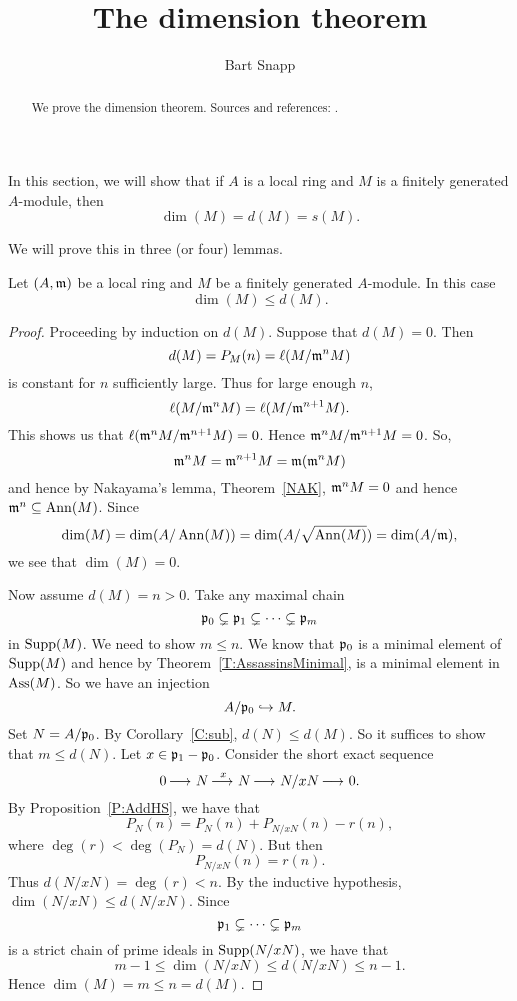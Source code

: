 \documentclass{ximera}
\author{Bart Snapp}
\title{The dimension theorem}
\begin{document}
\begin{abstract}
  We prove the dimension theorem. Sources and
  references: \cite{sD2008,hM1986}.
\end{abstract}
\maketitle


In this section, we will show that if $A$ is a local ring and $M$ is a
finitely generated $A$-module, then
\[
\dim(M) = d(M) = s(M). 
\]

We will prove this in three (or four) lemmas.

\begin{lemma}\label{L:dimd}
  Let $(A,\mathfrak{m})$ be a local ring and $M$ be a finitely generated
  $A$-module. In this case
  \[
  \dim(M)\le d(M).
  \]
  \begin{proof}
    Proceeding by induction on $d(M)$. Suppose that $d(M) = 0$. Then 
    \[
    d(M) = P_M(n) = \ell(M/\mathfrak{m}^n M)
    \]
    is constant for $n$ sufficiently large. Thus for large enough $n$,
    \[
    \ell(M/\mathfrak{m}^n M) = \ell(M/\mathfrak{m}^{n+1}M).
    \]
    This shows us that $\ell(\mathfrak{m}^n M/\mathfrak{m}^{n+1}M) = 0$. Hence $\mathfrak{m}^n
    M/\mathfrak{m}^{n+1}M = 0$. So,
    \[
    \mathfrak{m}^n M = \mathfrak{m}^{n+1}M = \mathfrak{m}(\mathfrak{m}^n M)
    \]
    and hence by Nakayama's lemma, Theorem~\ref{NAK},
     $\mathfrak{m}^n M =0$ and hence $\mathfrak{m}^n\subseteq\operatorname{Ann}(M)$. Since
    \[
    \dim(M) = \dim(A/\operatorname{Ann}(M))  = \dim(A/\sqrt{\operatorname{Ann}(M)}) = \dim(A/\mathfrak{m}),
    \]   
    we see that $\dim(M) = 0$. 
    
    Now assume $d(M) = n> 0$. Take any maximal chain 
    \[
    \mathfrak{p}_0\subsetneq \mathfrak{p}_1 \subsetneq \cdots \subsetneq \mathfrak{p}_m
    \]
    in $\operatorname{Supp}(M)$.  We need to show $m\le n$. We know that $\mathfrak{p}_0$ is a
    minimal element of $\operatorname{Supp}(M)$ and hence by
    Theorem~\ref{T:AssassinsMinimal}, is a minimal element in
    $\operatorname{Ass}(M)$.  So we have an injection
    \[
    A/\mathfrak{p}_0\hookrightarrow M.
    \]
    Set $N = A/\mathfrak{p}_0$.  By Corollary~\ref{C:sub}, $d(N) \le d(M)$.  So
    it suffices to show that $m \le d(N)$.  Let $x \in \mathfrak{p}_1 - \mathfrak{p}_0$.
    Consider the short exact sequence
    \[
    0\mathop{\longrightarrow\,}\limits N \mathop{\longrightarrow\,}\limits^{x} N \mathop{\longrightarrow\,}\limits N/xN \mathop{\longrightarrow\,}\limits 0.
    \]
    By Proposition~\ref{P:AddHS}, we have that
    \[
    P_N(n) = P_N(n) + P_{N/xN}(n) - r(n),
    \]
    where $\deg(r) < \deg(P_N) = d(N)$.  But then
    \[
    P_{N/xN}(n) = r(n).
    \]
    Thus $d(N/xN) = \deg(r) < n$.  By the inductive hypothesis,
    $\dim(N/xN) \le d(N/xN)$.  Since
    \[
    \mathfrak{p}_1 \subsetneq \cdots \subsetneq \mathfrak{p}_m
    \]
    is a strict chain of prime ideals in $\operatorname{Supp}(N/xN)$, we have that
    \[
    m - 1 \le \dim(N/xN) \le d(N/xN) \le n - 1.
    \]
    Hence $\dim(M) = m \le n = d(M)$.
  \end{proof}
\end{lemma}
\end{document}
